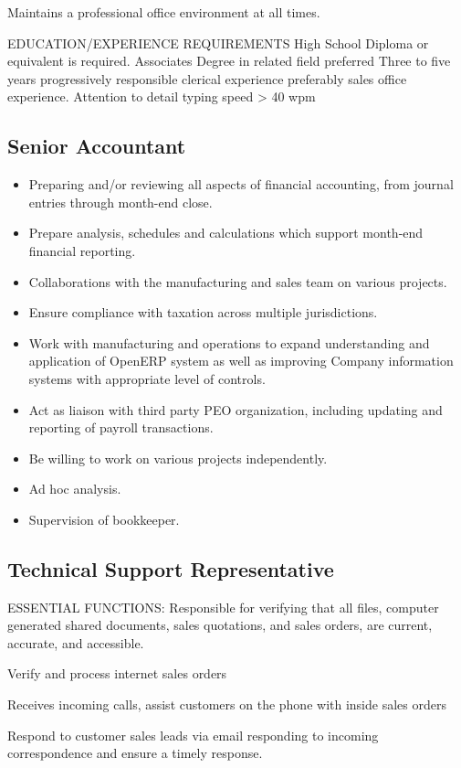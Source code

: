 Maintains a professional office environment at all times.

EDUCATION/EXPERIENCE REQUIREMENTS
High School Diploma or equivalent is required.  Associates Degree in related field preferred
Three to five years progressively responsible clerical experience preferably sales office experience.
Attention to detail
typing speed > 40 wpm

\subsection{Senior Accountant}
\begin{itemize}
 \item Preparing and/or reviewing all aspects of financial accounting, from journal entries through month-end close.
 \item Prepare analysis, schedules and calculations which support month-end financial reporting.
 \item Collaborations with the manufacturing and sales team on various projects.
 \item Ensure compliance with taxation across multiple jurisdictions.
 \item Work with manufacturing and operations to expand understanding and application of OpenERP system as well as improving Company information systems with appropriate level of controls.
 \item Act as liaison with third party PEO organization, including updating and reporting of payroll transactions.
 \item Be willing to work on various projects independently.
 \item Ad hoc analysis.
 \item Supervision of bookkeeper.
\end{itemize}

\subsection{Technical Support Representative}
ESSENTIAL FUNCTIONS:
Responsible for verifying that all files, computer generated shared documents, sales quotations, and sales orders, are current, accurate, and accessible.

Verify and process internet sales orders

Receives incoming calls, assist customers on the phone with inside sales orders

Respond to customer sales leads via email responding to incoming correspondence and ensure a timely response.

